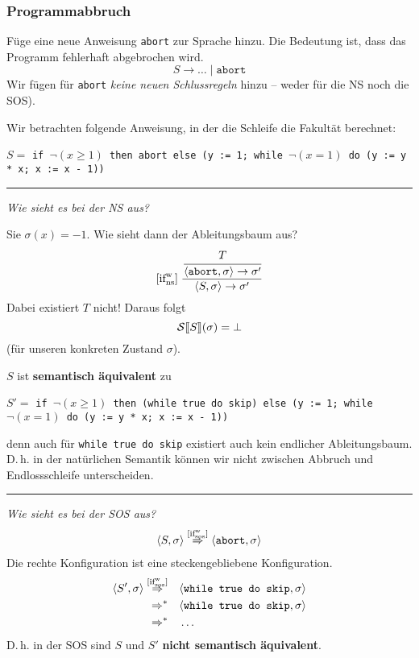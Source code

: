 \subsubsection{Programmabbruch}

Füge eine neue Anweisung \texttt{abort} zur Sprache hinzu. Die Bedeutung ist, dass das Programm fehlerhaft abgebrochen wird.
\[
    S \to \dots \;\vert\; \texttt{abort}
\]
Wir fügen für \texttt{abort} \emph{keine neuen Schlussregeln} hinzu -- weder für die NS noch die SOS).

\begin{example}
    Wir betrachten folgende Anweisung, in der die Schleife die Fakultät berechnet:

    $S =$ \texttt{if $\neg(x \geq 1)$ then abort else (y := 1; while $\neg(x = 1)$ do (y := y * x; x := x - 1))}

    \par\bigskip
    \hrule
    \emph{Wie sieht es bei der NS aus?}

    Sie $\sigma(x) = -1$. Wie sieht dann der Ableitungsbaum aus?
    \begin{align*}
        \infruleNs[\true]{if}\; \frac{
            \cfrac{
                T
            }{
                \strans{\texttt{abort}}{\sigma}{\sigma'}
            }
        }{
            \strans{S}{\sigma}{\sigma'}
        }
    \end{align*}
    Dabei existiert $T$ nicht! Daraus folgt \[
        \Ssem{S}(\sigma) = \bot
    \] (für unseren konkreten Zustand $\sigma$).

    $S$ ist \textbf{semantisch äquivalent} zu

    $S' =$ \texttt{if $\neg(x \geq 1)$ then (while true do skip) else (y := 1; while $\neg(x = 1)$ do (y := y * x; x := x - 1))}

    denn auch für \texttt{while true do skip} existiert auch kein endlicher Ableitungsbaum. D.\,h. in der natürlichen Semantik können wir nicht zwischen Abbruch und Endlossschleife unterscheiden.

    \par\bigskip
    \hrule
    \emph{Wie sieht es bei der SOS aus?}
    \begin{align*}
        \langle S, \sigma \rangle \overset{\infruleSos[\true]{if}}{\Rightarrow} \langle \texttt{abort}, \sigma \rangle
    \end{align*}
    Die rechte Konfiguration ist eine steckengebliebene Konfiguration.
    \begin{align*}
        \langle S', \sigma \rangle \overset{\infruleSos[\true]{if}}{\Rightarrow} & \quad \langle \texttt{while true do skip}, \sigma \rangle \\
        \Rightarrow^* & \quad \langle \texttt{while true do skip}, \sigma \rangle \\
        \Rightarrow^* & \quad \dots
    \end{align*}
    D.\,h. in der SOS sind $S$ und $S'$ \textbf{nicht semantisch äquivalent}.
\end{example}



